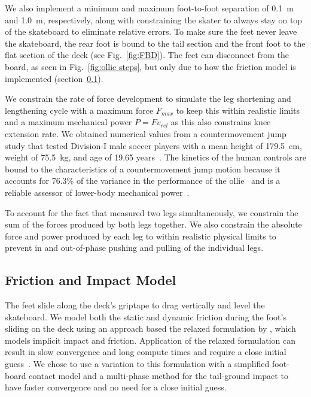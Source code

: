 \documentclass[default,iicol]{sn-jnl}
\begin{document}
We also implement a minimum and maximum foot-to-foot separation of \SI{0.1}{\meter} and \SI{1.0}{\meter}, respectively, along with constraining the skater to always stay on top of the skateboard to eliminate relative errors.
To make sure the feet never leave the skateboard, the rear foot is bound to the tail section and the front foot to the flat section of the deck (see Fig.~\ref{fig:FBD}).
The feet can disconnect from the board, as seen in Fig.~\ref{fig:ollie steps}, but only due to how the friction model is implemented (section~\ref{ss_friction}).

We constrain the rate of force development to simulate the leg shortening and lengthening cycle with a maximum force $F_{max}$ to keep this within realistic limits and a maximum mechanical power $P = F v_{rel}$ as this also constrains knee extension rate. We obtained numerical values from a countermovement jump study that tested Division-I male soccer players with a mean height of \SI{179.5}{\centi\meter}, weight of \SI{75.5}{\kilo\gram}, and age of 19.65 years~\cite{barker_relationships_2018}. The kinetics of the human controls are bound to the characteristics of a countermovement jump motion because it accounts for 76.3\% of the variance in the performance of the ollie~\cite{candotti_lower_2012} and is a reliable assessor of lower-body mechanical power~\cite{barker_relationships_2018}. 

To account for the fact that \citet{barker_relationships_2018} measured two legs simultaneously, we constrain the sum of the forces produced by both legs together. We also constrain the absolute force and power produced by each leg to within realistic physical limits to prevent in and out-of-phase pushing and pulling of the individual legs.

\subsection{Friction and Impact Model} \label{ss_friction}
The feet slide along the deck's griptape to drag vertically and level the skateboard. We model both the static and dynamic friction during the foot's sliding on the deck using an approach based the relaxed formulation by \citet{patel_contact-implicit_2019}, which models implicit impact and friction.
Application of the relaxed formulation can result in slow convergence and long compute times and require a close initial guess~\cite{shield_contact-implicit_2022}. We chose to use a variation to this formulation with a simplified foot-board contact model and a multi-phase method for the tail-ground impact to have faster convergence and no need for a close initial guess.
\end{document}

